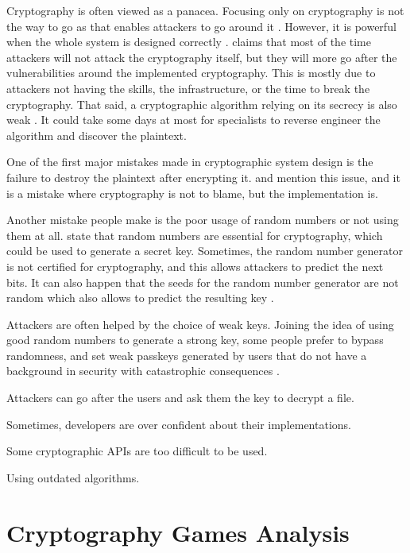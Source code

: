 \documentclass{l4proj}
\begin{document}
Cryptography is often viewed as a panacea. Focusing only on cryptography is not the way to go as that enables attackers to go around it \citep{schneier_security_nodate}.
However, it is powerful when the whole system is designed correctly \citep{schneier_security_nodate}. 
\citet{schneier_security_nodate} claims that most of the time attackers will not attack the cryptography itself, but they will more go after the vulnerabilities around the
implemented cryptography. This is mostly due to attackers not having the skills, the infrastructure, or the time to break the cryptography. 
That said, a cryptographic algorithm relying on its secrecy is also weak \citep{schneier_security_nodate}. It could take some days at most for specialists to reverse engineer 
the algorithm and discover the plaintext.

One of the first major mistakes made in cryptographic system design is the failure to destroy the plaintext after encrypting it. 
\citet{schneier_security_nodate} and \citet{lazar_why_nodate} mention this issue, and it is a mistake where cryptography is not to blame, but the implementation is.

Another mistake people make is the poor usage of random numbers or not using them at all. \citet{lazar_why_nodate} state that random numbers are essential for cryptography, 
which could be used to generate a secret key. Sometimes, the random number generator is not certified for cryptography, and this allows attackers to predict the next bits.
It can also happen that the seeds for the random number generator are not random which also allows to predict the resulting key \citep{lazar_why_nodate}.

Attackers are often helped by the choice of weak keys. Joining the idea of using good random numbers to generate a strong key, some people prefer to bypass randomness,
and set weak passkeys generated by users that do not have a background in security with catastrophic consequences \citep{schneier_security_nodate}.

Attackers can go after the users and ask them the key to decrypt a file.

Sometimes, developers are over confident about their implementations.

Some cryptographic APIs are too difficult to be used.

Using outdated algorithms.

\section{Cryptography Games Analysis}
\end{document}
